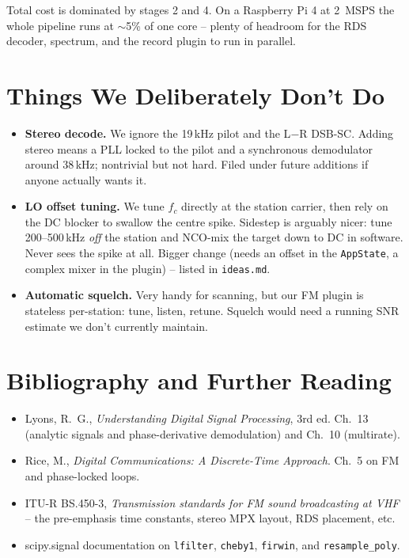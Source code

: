 \documentclass[11pt,a4paper]{article}
\begin{document}
Total cost is dominated by stages 2 and 4.  On a Raspberry Pi 4 at
\SI{2}{MSPS} the whole pipeline runs at $\sim$5\% of one core --
plenty of headroom for the RDS decoder, spectrum, and the record
plugin to run in parallel.

\section{Things We Deliberately Don't Do}

\begin{itemize}
  \item \textbf{Stereo decode.}  We ignore the 19\,kHz pilot and the
        L$-$R DSB-SC.  Adding stereo means a PLL locked to the pilot
        and a synchronous demodulator around 38\,kHz; nontrivial but
        not hard.  Filed under future additions if anyone actually
        wants it.
  \item \textbf{LO offset tuning.}  We tune \(f_c\) directly at the
        station carrier, then rely on the DC blocker to swallow the
        centre spike.  Sidestep is arguably nicer: tune 200--500\,kHz
        \emph{off} the station and NCO-mix the target down to DC in
        software.  Never sees the spike at all.  Bigger change (needs
        an offset in the \texttt{AppState}, a complex mixer in the
        plugin) -- listed in \texttt{ideas.md}.
  \item \textbf{Automatic squelch.}  Very handy for scanning, but our
        FM plugin is stateless per-station: tune, listen, retune.
        Squelch would need a running SNR estimate we don't currently
        maintain.
\end{itemize}

\section{Bibliography and Further Reading}

\begin{itemize}
  \item Lyons, R.\ G., \emph{Understanding Digital Signal Processing},
        3rd ed.  Ch.\ 13 (analytic signals and phase-derivative
        demodulation) and Ch.\ 10 (multirate).
  \item Rice, M., \emph{Digital Communications: A Discrete-Time
        Approach}.  Ch.\ 5 on FM and phase-locked loops.
  \item ITU-R BS.450-3, \emph{Transmission standards for FM sound
        broadcasting at VHF} -- the pre-emphasis time constants,
        stereo MPX layout, RDS placement, etc.
  \item scipy.signal documentation on \texttt{lfilter},
        \texttt{cheby1}, \texttt{firwin}, and \texttt{resample\_poly}.
\end{itemize}
\end{document}
